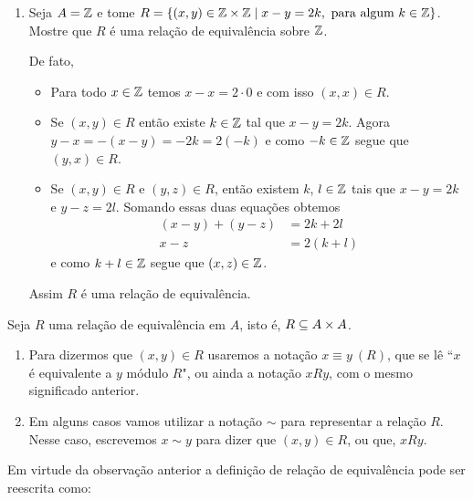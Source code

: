 \begin{exemplos}
\begin{enumerate}[label={\arabic*})]
        \item Seja $A = \mathbb{Z}$ e tome $R = \{(x,y)\in \mathbb{Z} \times \mathbb{Z} \mid x - y = 2k, \mbox{ para algum } k \in \mathbb{Z}\}$. Mostre que $R$
        \'e uma rela{\c c}{\~a}o de equival{\^e}ncia sobre $\mathbb{Z}$.
        \begin{solucao}
            De fato,
            \begin{itemize}
                \item Para todo $x\in\mathbb{Z}$ temos $x - x = 2\cdot0$ e com isso $(x,x) \in R$.
                \item Se $(x,y) \in R$ ent\~ao existe $k \in \mathbb{Z}$ tal que $x - y = 2k$. Agora $y - x = -(x - y) = -2k = 2 (-k)$
                e como $-k \in \mathbb{Z}$ segue que $(y,x) \in R$.
                \item Se $(x,y) \in R$ e $(y,z) \in R$, ent\~ao existem $k$, $l\in \mathbb{Z}$ tais que $x - y = 2k$ e $y - z = 2l$.
                Somando essas duas equa\c{c}\~oes obtemos
                \begin{align*}
                    (x - y) + (y - z) &= 2k + 2l\\
                    x - z &= 2(k + l)
                \end{align*}
                e como $k + l \in \mathbb{Z}$ segue que $(x,z) \in \mathbb{Z}$.
            \end{itemize}
            Assim $R$ \'e uma rela\c{c}\~ao de equival\^encia.
        \end{solucao}
    \end{enumerate}
\end{exemplos}
\begin{observacoes}
    Seja $R$ uma rela{\c c}{\~a}o de equival{\^e}ncia em $A$, isto \'e, $R \subseteq A \times A$.
    \begin{enumerate}[label={\arabic*})]
        \item  Para dizermos que $(x,y) \in R$ usaremos a nota{\c c}{\~a}o $x\equiv y\ (R)$, que se l{\^e} ``$x$ \'e equivalente a $y$ m{\'o}dulo $R$", ou ainda a nota{\c c}{\~a}o $xRy$, com o mesmo significado anterior.
        \item Em alguns casos vamos utilizar a nota\c{c}\~ao $\sim$ para representar a rela\c{c}\~ao $R$. Nesse caso, escrevemos $x \sim y$ para dizer que $(x, y) \in R$, ou que, $xRy$.
    \end{enumerate}
\end{observacoes}

Em virtude da observa\c{c}\~ao anterior a defini\c{c}\~ao de rela\c{c}\~ao de equival\^encia pode ser reescrita como:

